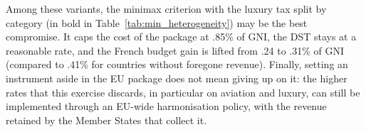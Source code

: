 \documentclass[a4paper, 11pt]{article}
\begin{document}
Among these variants, the minimax criterion with the luxury tax split by category (in bold in Table~\ref{tab:min_heterogeneity}) may be the best compromise. It caps the cost of the package at .85\% of GNI, 
the DST stays at a reasonable rate,  %
and the French budget gain is lifted from .24 to .31\% of GNI (compared to .41\% for countries without foregone revenue).
%
Finally, setting an instrument aside in the EU package does not mean giving up on it: the higher rates that this exercise discards, in particular on aviation and luxury, can still be implemented through an EU-wide harmonisation policy, with the revenue retained by the Member States that collect it. 



% 
% 
\end{document}
